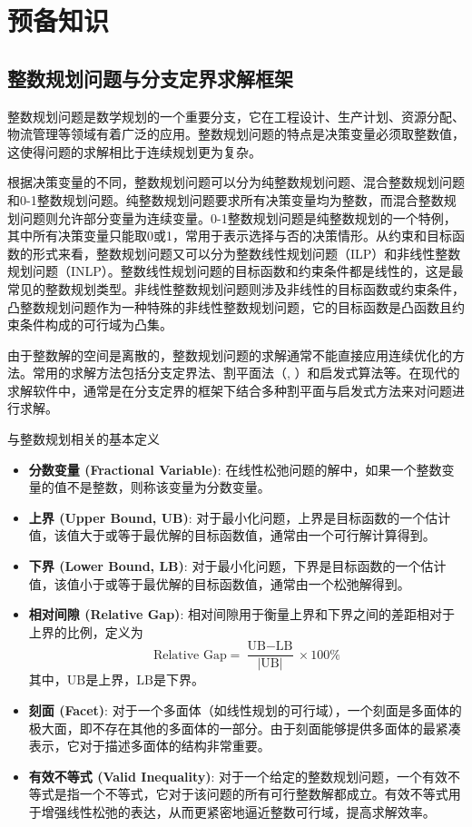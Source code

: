 \section{预备知识}
\subsection{整数规划问题与分支定界求解框架}
整数规划问题是数学规划的一个重要分支，它在工程设计、生产计划、资源分配、物流管理等领域有着广泛的应用。整数规划问题的特点是决策变量必须取整数值，这使得问题的求解相比于连续规划更为复杂。

根据决策变量的不同，整数规划问题可以分为纯整数规划问题、混合整数规划问题和0-1整数规划问题。纯整数规划问题要求所有决策变量均为整数，而混合整数规划问题则允许部分变量为连续变量。0-1整数规划问题是纯整数规划的一个特例，其中所有决策变量只能取0或1，常用于表示选择与否的决策情形。从约束和目标函数的形式来看，整数规划问题又可以分为整数线性规划问题（ILP）和非线性整数规划问题（INLP）。整数线性规划问题的目标函数和约束条件都是线性的，这是最常见的整数规划类型。非线性整数规划问题则涉及非线性的目标函数或约束条件，凸整数规划问题作为一种特殊的非线性整数规划问题，它的目标函数是凸函数且约束条件构成的可行域为凸集。

由于整数解的空间是离散的，整数规划问题的求解通常不能直接应用连续优化的方法。常用的求解方法包括分支定界法\cite{land1960automatic}、割平面法（\cite{gomory1958outline}, \cite{crowder1983solving}）和启发式算法等。在现代的求解软件中，通常是在分支定界的框架下结合多种割平面与启发式方法来对问题进行求解。

\begin{definition}
与整数规划相关的基本定义
\begin{itemize}
    \item \textbf{分数变量 (Fractional Variable)}: 在线性松弛问题的解中，如果一个整数变量的值不是整数，则称该变量为分数变量。
    
    \item \textbf{上界 (Upper Bound, UB)}: 对于最小化问题，上界是目标函数的一个估计值，该值大于或等于最优解的目标函数值，通常由一个可行解计算得到。
    
    \item \textbf{下界 (Lower Bound, LB)}: 对于最小化问题，下界是目标函数的一个估计值，该值小于或等于最优解的目标函数值，通常由一个松弛解得到。
    
    \item \textbf{相对间隙 (Relative Gap)}: 相对间隙用于衡量上界和下界之间的差距相对于上界的比例，定义为
    \[
    \text{Relative Gap} = \frac{\text{UB} - \text{LB}}{|\text{UB}|} \times 100\%
    \]
    其中，$\text{UB}$是上界，$\text{LB}$是下界。
    \item \textbf{刻面 (Facet)}: 对于一个多面体（如线性规划的可行域），一个刻面是多面体的极大面，即不存在其他的多面体的一部分。由于刻面能够提供多面体的最紧凑表示，它对于描述多面体的结构非常重要。

    \item \textbf{有效不等式 (Valid Inequality)}: 对于一个给定的整数规划问题，一个有效不等式是指一个不等式，它对于该问题的所有可行整数解都成立。有效不等式用于增强线性松弛的表达，从而更紧密地逼近整数可行域，提高求解效率。
\end{itemize}
\end{definition}

